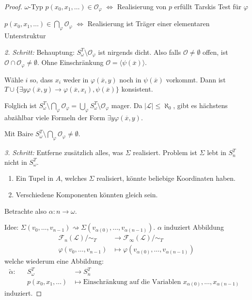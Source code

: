 \documentclass[12pt,parskip=full]{scrartcl}
\newcommand{\abs}[1]{{\left| #1 \right|}}
\theoremstyle{definition}
\begin{document}
\begin{proof}
		$\omega$-Typ $p(x_0, x_1, \dots) \in \mathcal{O}_\varphi$ $\Leftrightarrow$ Realisierung von $p$ erfüllt Tarskis Test für $\varphi$
		
		$p(x_0, x_1, \dots) \in \bigcap_\varphi \mathcal{O}_\varphi$ $\Leftrightarrow$ Realisierung ist Träger einer elementaren Unterstruktur
		
		\textit{2. Schritt:} Behauptung: $S_\omega^T \setminus \mathcal{O}_\varphi$ ist nirgends dicht. Also falls $\mathcal{O} \neq \emptyset$ offen, ist $\mathcal{O} \cap \mathcal{O}_\varphi \neq \emptyset$. Ohne Einschränkung $\mathcal{O} = \langle \psi(\overline{x}) \rangle$.
		
		Wähle $i$ so, dass $x_i$ weder in $\varphi(\overline{x}, y)$ noch in $\psi(\overline{x})$ vorkommt. Dann ist $T \cup \{ \exists y \varphi(\overline{x},y) \rightarrow \varphi(\overline{x}, x_i), \psi(\overline{x}) \}$ konsistent.
		
		Folglich ist $S_\omega^T \setminus \bigcap_\varphi \mathcal{O}_\varphi = \bigcup_\varphi S_\omega^T \setminus \mathcal{O}_\varphi$ mager. Da $\abs{\mathcal{L}} \leq \aleph_0$, gibt es hächstens abzählbar viele Formeln der Form $\exists y \varphi(\overline{x}, y)$.
		
		Mit Baire $S_\omega^T \setminus \bigcap_\varphi \mathcal{O}_\varphi \neq \emptyset$.
		
		\textit{3. Schritt:} Entferne zusätzlich alles, was $\Sigma$ realisiert. Problem ist $\Sigma$ lebt in $S_n^T$ nicht in $S_\omega^T$.
		\begin{enumerate}
			\item Ein Tupel in $A$, welches $\Sigma$ realisiert, könnte beliebige Koordinaten haben.
			\item Verschiedene Komponenten könnten gleich sein.
		\end{enumerate}
	
		Betrachte also $\alpha: n \to \omega$.
		
		Idee: $\Sigma(v_0, \dots, v_{n-1}) \rightsquigarrow \Sigma(v_{\alpha(0)}, \dots, v_{\alpha(n-1)})$. $\alpha$ induziert Abbildung
		\begin{align*}
			\mathcal{F}_n(\mathcal{L})/ \sim_T &\longrightarrow \mathcal{F}_\infty(\mathcal{L}) / \sim_T \\
			\varphi(v_0, \dots, v_{n-1}) &\longmapsto \varphi(v_{\alpha(0)}, \dots, v_{\alpha(n-1)})
		\end{align*}
		welche wiederum eine Abbildung:
		\begin{align*}
			\tilde{\alpha}:&& S_\omega^T &\longrightarrow S_n^T \\
			&&p(x_0, x_1, \dots) &\longmapsto \text{Einschränkung auf die Variablen $x_{\alpha(0)}, \dots, x_{\alpha(n-1)}$ }
		\end{align*}
		induziert.
		

\end{proof}
\end{document}
